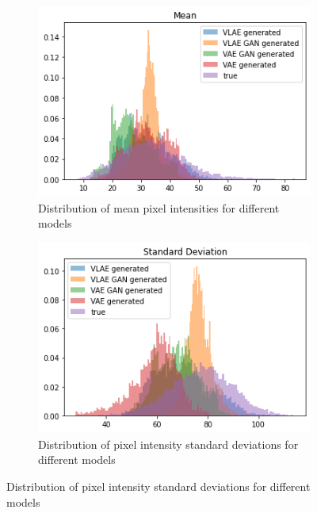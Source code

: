 \begin{figure}
    \centering
    \begin{subfigure}{0.48\textwidth}
        \centering
        \includegraphics[width=\textwidth]{images/generated_vs_true/mnist/mnist_vs_models_mean_gauss_post.png}
        \caption{Distribution of mean pixel intensities for different models}
        \label{subfig:mean_generated_vs_true_gauss_post}
    \end{subfigure}
    \hfill
    \begin{subfigure}{0.48\textwidth}
        \centering
        \includegraphics[width=\textwidth]{images/generated_vs_true/mnist/mnist_vs_models_sd_gauss_post.png}
        \caption{Distribution of pixel intensity standard deviations for different models}
        \label{subfig:sd_generated_vs_true_gauss_post}
    \end{subfigure}

\end{figure}
